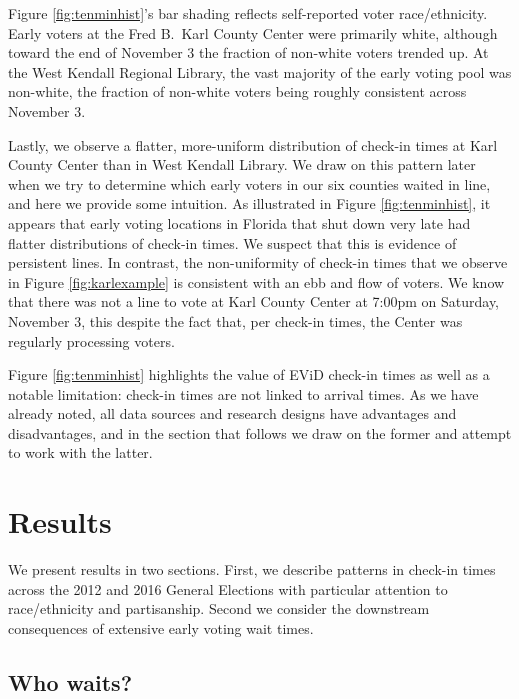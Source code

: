 \documentclass[12pt,titlepage]{article}
\begin{document}
Figure \ref{fig:tenminhist}'s bar shading reflects self-reported voter
race/ethnicity. Early voters at the Fred B.\ Karl County Center were
primarily white, although toward the end of November 3 the fraction of
non-white voters trended up. At the West Kendall Regional Library, the
vast majority of the early voting pool was non-white, the fraction of
non-white voters being roughly consistent across November 3.

Lastly, we observe a flatter, more-uniform distribution of check-in
times at Karl County Center than in West Kendall Library. We draw on
this pattern later when we try to determine which early voters in our
six counties waited in line, and here we provide some intuition. As
illustrated in Figure \ref{fig:tenminhist}, it appears that early
voting locations in Florida that shut down very late had flatter
distributions of check-in times. We suspect that this is evidence of
persistent lines. In contrast, the non-uniformity of check-in times
that we observe in Figure \ref{fig:karlexample} is consistent with an
ebb and flow of voters. We know that there was not a line to vote at
Karl County Center at 7:00pm on Saturday, November 3, this despite the
fact that, per check-in times, the Center was regularly processing
voters.

Figure \ref{fig:tenminhist} highlights the value of EViD check-in
times as well as a notable limitation: check-in times are not linked
to arrival times. As we have already noted, all data sources and
research designs have advantages and disadvantages, and in the section
that follows we draw on the former and attempt to work with the
latter.

\section*{Results}

We present results in two sections.  First, we describe patterns in
check-in times across the 2012 and 2016 General Elections with
particular attention to race/ethnicity and partisanship.  Second we
consider the downstream consequences of extensive early voting wait
times.


\subsection*{Who waits?}
\end{document}
